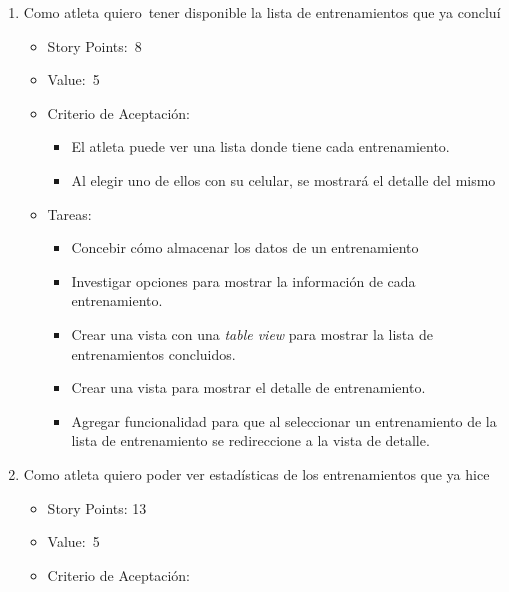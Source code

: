 \begin{enumerate}
\def\labelenumi{\arabic{enumi})}
\item
  Como atleta quiero~tener disponible la lista de entrenamientos que ya
  concluí

  \begin{itemize}
  \item
    Story Points:~8
  \item
    Value:~5
  \item
    Criterio de Aceptación:

    \begin{itemize}
    \itemsep1pt\parskip0pt
    \item
      El atleta puede ver una lista donde tiene cada entrenamiento.
    \item
      Al elegir uno de ellos con su celular, se mostrará el detalle del
      mismo
    \end{itemize}
  \item
    Tareas:

    \begin{itemize}
    \itemsep1pt\parskip0pt
    \item
      Concebir cómo almacenar los datos de un entrenamiento
    \item
      Investigar opciones para mostrar la información de cada
      entrenamiento.
    \item
      Crear una vista con una \emph{table view} para mostrar la lista de
      entrenamientos concluidos.
    \item
      Crear una vista para mostrar el detalle de entrenamiento.
    \item
      Agregar funcionalidad para que al seleccionar un entrenamiento de
      la lista de entrenamiento se redireccione a la vista de detalle.
    \end{itemize}
  \end{itemize}
\item
  Como atleta quiero poder ver estadísticas de los entrenamientos que ya
  hice

  \begin{itemize}
  \item
    Story Points: 13
  \item
    Value:~5
  \item
    Criterio de Aceptación:


\end{itemize}
\end{enumerate}

